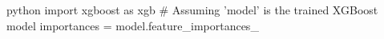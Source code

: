 python
import xgboost as xgb
# Assuming 'model' is the trained XGBoost model
importances = model.feature_importances_